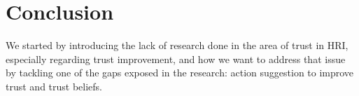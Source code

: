 \section{Conclusion}
\label{sec:Conclusion}
We started by introducing the lack of research done in the area of trust in \ac{HRI}, especially regarding trust improvement, and how we want to address that issue by tackling one of the gaps exposed in the research: action suggestion to improve trust and trust beliefs.